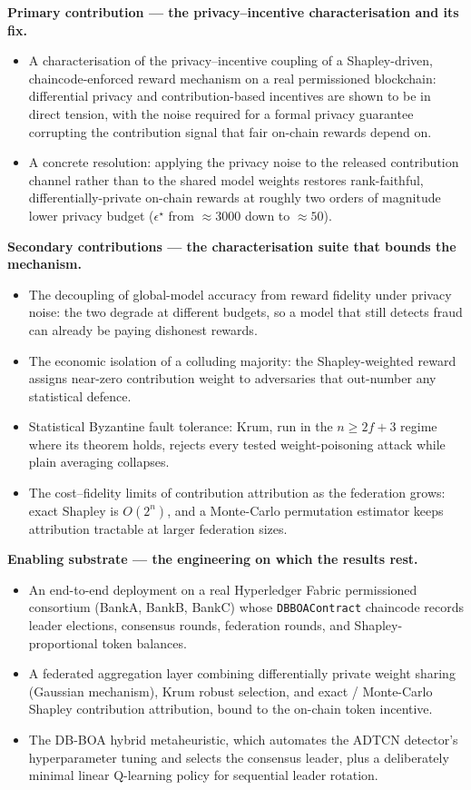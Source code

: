 \textbf{Primary contribution — the privacy--incentive characterisation and its fix.}
\begin{itemize}
  \item A characterisation of the privacy--incentive coupling of a Shapley-driven, chaincode-enforced reward mechanism on a real permissioned blockchain: differential privacy and contribution-based incentives are shown to be in direct tension, with the noise required for a formal privacy guarantee corrupting the contribution signal that fair on-chain rewards depend on.
  \item A concrete resolution: applying the privacy noise to the released contribution channel rather than to the shared model weights restores rank-faithful, differentially-private on-chain rewards at roughly two orders of magnitude lower privacy budget ($\epsilon^{\star}$ from $\approx 3000$ down to $\approx 50$).
\end{itemize}

\textbf{Secondary contributions — the characterisation suite that bounds the mechanism.}
\begin{itemize}
  \item The decoupling of global-model accuracy from reward fidelity under privacy noise: the two degrade at different budgets, so a model that still detects fraud can already be paying dishonest rewards.
  \item The economic isolation of a colluding majority: the Shapley-weighted reward assigns near-zero contribution weight to adversaries that out-number any statistical defence.
  \item Statistical Byzantine fault tolerance: Krum, run in the $n \ge 2f+3$ regime where its theorem holds, rejects every tested weight-poisoning attack while plain averaging collapses.
  \item The cost--fidelity limits of contribution attribution as the federation grows: exact Shapley is $O(2^n)$, and a Monte-Carlo permutation estimator keeps attribution tractable at larger federation sizes.
\end{itemize}

\textbf{Enabling substrate — the engineering on which the results rest.}
\begin{itemize}
  \item An end-to-end deployment on a real Hyperledger Fabric permissioned consortium (BankA, BankB, BankC) whose \texttt{DBBOAContract} chaincode records leader elections, consensus rounds, federation rounds, and Shapley-proportional token balances.
  \item A federated aggregation layer combining differentially private weight sharing (Gaussian mechanism), Krum robust selection, and exact / Monte-Carlo Shapley contribution attribution, bound to the on-chain token incentive.
  \item The DB-BOA hybrid metaheuristic, which automates the ADTCN detector's hyperparameter tuning and selects the consensus leader, plus a deliberately minimal linear Q-learning policy for sequential leader rotation.
\end{itemize}

